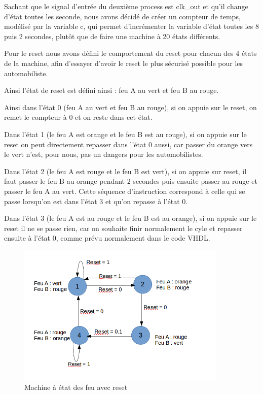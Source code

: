 \documentclass[11pt]{report}
\begin{document}
Sachant que le signal d'entrée du deuxième process est clk\_out et qu'il change d'état toutes les seconde, nous avons décidé de créer un compteur de temps, modélisé par la variable c, qui permet d'incrémenter la variable d'état toutes les 8 puis 2 secondes, plutôt que de faire une machine à 20 états différents.

Pour le reset nous avons défini le comportement du reset pour chacun des 4 états de la machine, afin d'essayer d'avoir le reset le plus sécurisé possible pour les automobiliste.

Ainsi l'état de reset est défini ainsi : feu A au vert et feu B au rouge.

Ainsi dans l'état 0 (feu A au vert et feu B au rouge), si on appuie sur le reset, on remet le compteur à 0 et on reste dans cet état.

Dans l'état 1 (le feu A est orange et le feu B est au rouge), si on appuie sur le reset on peut directement repasser dans l'état 0 aussi, car passer du orange vers le vert n'est, pour nous, pas un dangers pour les automobilistes.

Dans l'état 2 (le feu A est rouge et le feu B est vert), si on appuie sur reset, il faut passer le feu B au orange pendant 2 secondes puis ensuite passer au rouge et passer le feu A au vert. Cette séquence d'instruction correspond à celle qui se passe lorsqu'on est dans l'état 3 et qu'on repasse à l'état 0.

Dans l'état 3 (le feu A est au rouge et le feu B est au orange), si on appuie sur le reset il ne se passe rien, car on souhaite finir normalement le cyle et repasser ensuite à l'état 0, comme prévu normalement dans le code VHDL.

\begin{figure}[h]
\includegraphics[width=10cm]{TP03-3.png}
\caption{Machine à état des feu avec reset}
\end{figure}
\end{document}
